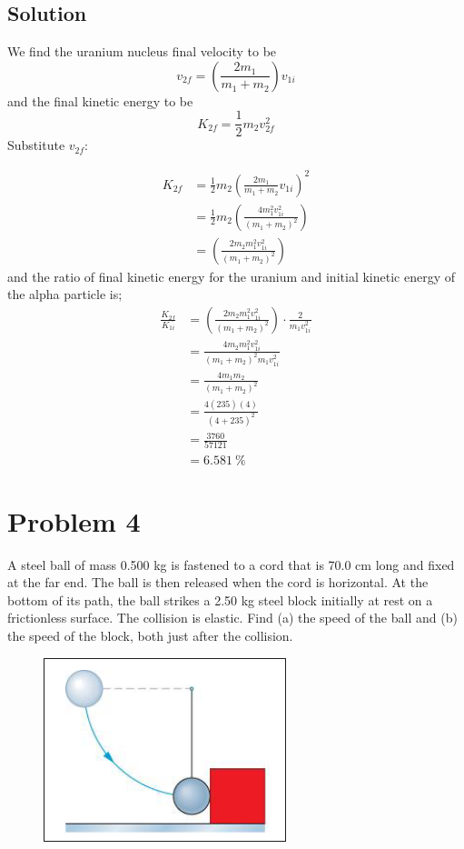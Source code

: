 \documentclass{article}
\begin{document}
\subsection*{Solution}
We find the uranium nucleus final velocity to be
\[
v_{2f} = \left( \frac{2 m_1}{m_1 + m_2} \right) v_{1i}
\]
and the final kinetic energy to be
\[
K_{2f} = \frac{1}{2} m_2 v_{2f}^2
\]
Substitute \( v_{2f} \):

\begin{align*}
K_{2f} &= \frac{1}{2} m_2 \left( \frac{2 m_1}{m_1 + m_2} v_{1i} \right)^2 \\
	&= \frac{1}{2} m_2 \left( \frac{4 m_1^2 v_{1i}^2}{(m_1 + m_2)^2} \right) \\
	&= \left( \frac{2 m_2 m_1^2 v_{1i}^2}{(m_1 + m_2)^2} \right)
\end{align*}
and the ratio of final kinetic energy for the uranium and initial kinetic energy of the alpha particle is;
\begin{align*}
	\frac{K_{2f}}{K_{1i}} &= \left( \frac{2 m_2 m_1^2 v_{1i}^2}{(m_1 + m_2)^2} \right) \cdot \frac{2}{m_1v_{1i}^2} \\
	&= \frac{4 m_2 m_1^2 v_{1i}^2}{(m_1 + m_2)^2 m_1v_{1i}^2} \\
	&= \frac{4 m_1 m_2}{(m_1 + m_2)^2} \\
	&= \frac{4(235)(4)}{(4+235)^2} \\
	&= \frac{3760}{57121} \\
	&= \boxed{6.581\ \%}
\end{align*}

\section*{Problem 4}
A steel ball of mass 0.500 kg is fastened to a cord that is 70.0 cm long and fixed at the far end. The
ball is then released when the cord is horizontal. At the bottom of its path, the ball strikes a 2.50 kg steel
block initially at rest on a frictionless surface. The collision is elastic. Find (a) the speed of the ball and
(b) the speed of the block, both just after the collision.

\begin{figure}[ht]
    \centering
    \includegraphics[scale=0.5]{drawing-1.png}
\end{figure}
\end{document}
